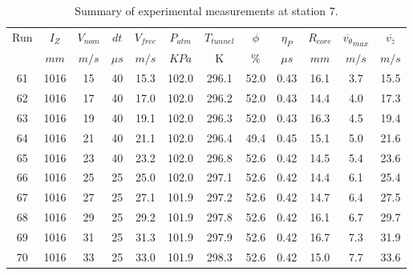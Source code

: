 \begin{table}[H]
\begin{center}
\begin{tabular}{|cccccccccccc|}
	\hline
	Run & $I_Z$ & $V_{nom}$ & $dt$ & $V_{free}$ & $P_{atm}$ & $T_{tunnel}$ & $\phi$ & $\eta_P$ & $R_{core}$ & $\overline{v_{\theta}}_{max}$ & $\overline{v_{\bar{z}}}$\\
	  & $mm$ & $m/s$ & $\mu s$ & $m/s$ & $KPa$ & K & $\%$ & $\mu s$ & $mm$ & $m/s$ & $m/s$\\
	\hline
	61 & 1016 & 15 & 40 & 15.3 & 102.0 & 296.1 & 52.0 & 0.43 & 16.1 & 3.7 & 15.5\\
	62 & 1016 & 17 & 40 & 17.0 & 102.0 & 296.2 & 52.0 & 0.43 & 14.4 & 4.0 & 17.3\\
	63 & 1016 & 19 & 40 & 19.1 & 102.0 & 296.3 & 52.0 & 0.43 & 16.3 & 4.5 & 19.4\\
	64 & 1016 & 21 & 40 & 21.1 & 102.0 & 296.4 & 49.4 & 0.45 & 15.1 & 5.0 & 21.6\\
	65 & 1016 & 23 & 40 & 23.2 & 102.0 & 296.8 & 52.6 & 0.42 & 14.5 & 5.4 & 23.6\\
	66 & 1016 & 25 & 25 & 25.0 & 102.0 & 297.1 & 52.6 & 0.42 & 14.4 & 6.1 & 25.4\\
	67 & 1016 & 27 & 25 & 27.1 & 101.9 & 297.2 & 52.6 & 0.42 & 14.7 & 6.4 & 27.5\\
	68 & 1016 & 29 & 25 & 29.2 & 101.9 & 297.8 & 52.6 & 0.42 & 16.1 & 6.7 & 29.7\\
	69 & 1016 & 31 & 25 & 31.3 & 101.9 & 297.9 & 52.6 & 0.42 & 16.7 & 7.3 & 31.9\\
	70 & 1016 & 33 & 25 & 33.0 & 101.9 & 298.3 & 52.6 & 0.42 & 15.0 & 7.7 & 33.6\\
	\hline
\end{tabular}
\caption{Summary of experimental measurements at station 7.}
\label{table:experiment_results_7}
\end{center}
\end{table}
